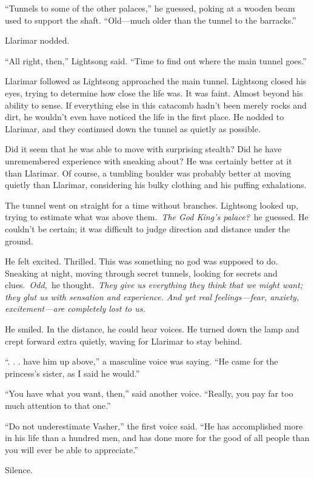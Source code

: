 “Tunnels to some of the other palaces,” he guessed, poking at a wooden beam used to support the shaft. “Old—much older than the tunnel to the barracks.”

Llarimar nodded.

“All right, then,” Lightsong said. “Time to find out where the main tunnel goes.”

Llarimar followed as Lightsong approached the main tunnel. Lightsong closed his eyes, trying to determine how close the life was. It was faint. Almost beyond his ability to sense. If everything else in this catacomb hadn’t been merely rocks and dirt, he wouldn’t even have noticed the life in the first place. He nodded to Llarimar, and they continued down the tunnel as quietly as possible.

Did it seem that he was able to move with surprising stealth? Did he have unremembered experience with sneaking about? He was certainly better at it than Llarimar. Of course, a tumbling boulder was probably better at moving quietly than Llarimar, considering his bulky clothing and his puffing exhalations.

The tunnel went on straight for a time without branches. Lightsong looked up, trying to estimate what was above them.~\textit{The God King’s palace?}~he guessed. He couldn’t be certain; it was difficult to judge direction and distance under the ground.

He felt excited. Thrilled. This was something no god was supposed to do. Sneaking at night, moving through secret tunnels, looking for secrets and clues.~\textit{Odd,}~he thought.~\textit{They give us everything they think that we might want; they glut us with sensation and experience. And yet real feelings—fear, anxiety, excitement—are completely lost to us.}

He smiled. In the distance, he could hear voices. He turned down the lamp and crept forward extra quietly, waving for Llarimar to stay behind.

“. . . have him up above,” a masculine voice was saying. “He came for the princess’s sister, as I said he would.”

“You have what you want, then,” said another voice. “Really, you pay far too much attention to that one.”

“Do not underestimate Vasher,” the first voice said. “He has accomplished more in his life than a hundred men, and has done more for the good of all people than you will ever be able to appreciate.”

Silence.

